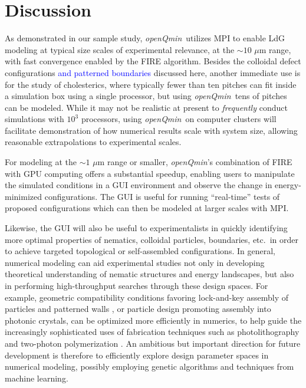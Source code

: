 \documentclass[utf8]{frontiersFPHY} %
\newcommand{\DAB}[1]{\textcolor{blue}{#1}}
\def\PackageName{\textit{openQmin}}
\begin{document}
\section{Discussion} \label{sec: Discussion}

As demonstrated in our sample study, \PackageName\ utilizes MPI to enable LdG modeling at typical size scales of  experimental relevance, at the $\sim 10$ $\mu$m range, with fast convergence enabled by the FIRE algorithm. Besides the colloidal defect configurations \DAB{and patterned boundaries} discussed here, another immediate use is for the study of cholesterics, where typically fewer than ten pitches can fit inside a simulation box using a single processor, but using \PackageName\ tens of pitches can be modeled. While it may not be realistic at present to \textit{frequently} conduct simulations with $10^3$ processors, using \PackageName\ on computer clusters will facilitate demonstration of how numerical results scale with system size, allowing reasonable extrapolations to experimental scales.   

For modeling at the $\sim 1$ $\mu$m range or smaller, \PackageName's combination of FIRE with GPU computing offers a substantial speedup, enabling users to manipulate the simulated conditions in a GUI environment and observe the change in energy-minimized configurations. The GUI is useful for running ``real-time'' tests   of proposed configurations which can then be modeled at larger scales with MPI.

Likewise, the GUI will also be useful to experimentalists in quickly identifying more optimal properties of nematics, colloidal particles, boundaries, etc.\ in order to achieve targeted topological or self-assembled configurations. In general, numerical modeling can aid experimental studies not only in developing theoretical understanding of nematic structures and energy landscapes, but also in performing high-throughput searches through these design spaces. For example, geometric compatibility conditions favoring lock-and-key assembly of particles and patterned walls \citep{eskandari2014particlesoftmatter,luo2018tunable}, or particle design promoting assembly into photonic crystals, can be optimized more efficiently in numerics, to help guide the increasingly sophisticated uses of fabrication techniques  such as photolithography and two-photon polymerization \citep{martinez2014mutually}. %
An ambitious but important direction for future development is therefore to efficiently explore design parameter spaces in numerical modeling, possibly employing genetic algorithms and techniques from machine learning. 
\end{document}
